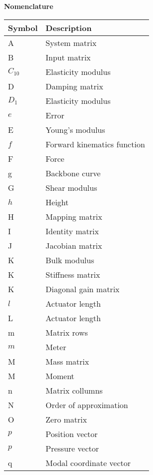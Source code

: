 \begin{spacing}{0.9}

\Large{\textbf{Nomenclature}}

\begin{multicols}{2}
\begin{table}[H]
\centering
    \begin{tabular}{p{1.5cm} p{5cm}} \hline
    \textbf{Symbol}    &   \textbf{Description }\\ \hline
    A      &  System matrix \\
    B     &  Input matrix \\
    $C_{10}$     &  Elasticity modulus \\
    D     &  Damping matrix \\
    $D_1$     &  Elasticity modulus \\
    $e$     & Error \\
    E     &  Young's modulus \\
    $f$     & Forward kinematics function \\
    F     & Force \\
    g     &  Backbone curve \\
    G     &  Shear modulus \\
    $h$     &  Height \\
    H     &  Mapping matrix \\
    I     &  Identity matrix \\
    J     &  Jacobian matrix \\
    K     &  Bulk modulus \\
    K     &  Stiffness matrix \\
    K     &  Diagonal gain matrix \\
    $l$     &  Actuator length \\
    L     &  Actuator length \\
    m     &  Matrix rows \\
    $m$     &  Meter \\
    M     &  Mass matrix \\
    M     &  Moment \\
    n     &  Matrix collumns \\
    N     & Order of approximation \\
    O     &  Zero matrix \\
    $p$     & Position vector \\
    $p$     & Pressure vector \\
    q     & Modal coordinate vector \\

\end{tabular}
\end{table}
\end{multicols}
\end{spacing}
